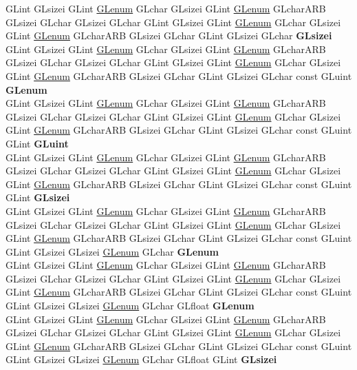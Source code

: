 \begin{DoxyCompactItemize}
\begin{tabbing}
\>GLint GLsizei GLint \hyperlink{interfacevoid}{GLenum} GLchar GLsizei GLint \hyperlink{interfacevoid}{GLenum} GLcharARB GLsizei GLchar GLsizei GLchar GLint GLsizei GLint \hyperlink{interfacevoid}{GLenum} GLchar GLsizei GLint \hyperlink{interfacevoid}{GLenum} GLcharARB GLsizei GLchar GLint GLsizei GLchar {\bfseries GLsizei}\\
\>GLint GLsizei GLint \hyperlink{interfacevoid}{GLenum} GLchar GLsizei GLint \hyperlink{interfacevoid}{GLenum} GLcharARB GLsizei GLchar GLsizei GLchar GLint GLsizei GLint \hyperlink{interfacevoid}{GLenum} GLchar GLsizei GLint \hyperlink{interfacevoid}{GLenum} GLcharARB GLsizei GLchar GLint GLsizei GLchar const GLuint {\bfseries GLenum}\\
\>GLint GLsizei GLint \hyperlink{interfacevoid}{GLenum} GLchar GLsizei GLint \hyperlink{interfacevoid}{GLenum} GLcharARB GLsizei GLchar GLsizei GLchar GLint GLsizei GLint \hyperlink{interfacevoid}{GLenum} GLchar GLsizei GLint \hyperlink{interfacevoid}{GLenum} GLcharARB GLsizei GLchar GLint GLsizei GLchar const GLuint GLint {\bfseries GLuint}\\
\>GLint GLsizei GLint \hyperlink{interfacevoid}{GLenum} GLchar GLsizei GLint \hyperlink{interfacevoid}{GLenum} GLcharARB GLsizei GLchar GLsizei GLchar GLint GLsizei GLint \hyperlink{interfacevoid}{GLenum} GLchar GLsizei GLint \hyperlink{interfacevoid}{GLenum} GLcharARB GLsizei GLchar GLint GLsizei GLchar const GLuint GLint {\bfseries GLsizei}\\
\>GLint GLsizei GLint \hyperlink{interfacevoid}{GLenum} GLchar GLsizei GLint \hyperlink{interfacevoid}{GLenum} GLcharARB GLsizei GLchar GLsizei GLchar GLint GLsizei GLint \hyperlink{interfacevoid}{GLenum} GLchar GLsizei GLint \hyperlink{interfacevoid}{GLenum} GLcharARB GLsizei GLchar GLint GLsizei GLchar const GLuint GLint GLsizei GLsizei \hyperlink{interfacevoid}{GLenum} GLchar {\bfseries GLenum}\\
\>GLint GLsizei GLint \hyperlink{interfacevoid}{GLenum} GLchar GLsizei GLint \hyperlink{interfacevoid}{GLenum} GLcharARB GLsizei GLchar GLsizei GLchar GLint GLsizei GLint \hyperlink{interfacevoid}{GLenum} GLchar GLsizei GLint \hyperlink{interfacevoid}{GLenum} GLcharARB GLsizei GLchar GLint GLsizei GLchar const GLuint GLint GLsizei GLsizei \hyperlink{interfacevoid}{GLenum} GLchar GLfloat {\bfseries GLenum}\\
\>GLint GLsizei GLint \hyperlink{interfacevoid}{GLenum} GLchar GLsizei GLint \hyperlink{interfacevoid}{GLenum} GLcharARB GLsizei GLchar GLsizei GLchar GLint GLsizei GLint \hyperlink{interfacevoid}{GLenum} GLchar GLsizei GLint \hyperlink{interfacevoid}{GLenum} GLcharARB GLsizei GLchar GLint GLsizei GLchar const GLuint GLint GLsizei GLsizei \hyperlink{interfacevoid}{GLenum} GLchar GLfloat GLint {\bfseries GLsizei}\\

\end{tabbing}
\end{DoxyCompactItemize}
